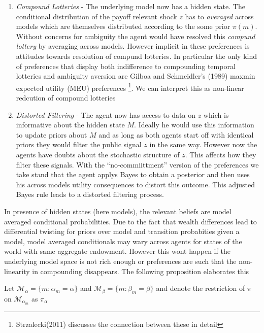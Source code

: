 \documentclass[12pt]{article}
\begin{document}
\begin{enumerate}
\item \emph{Compound Lotteries}  - The underlying model  now has a hidden state. The conditional distribution of the payoff relevant shock $z$  has to \emph{averaged} across models which are themselves distributed according to the some prior $\pi(m)$. Without concerns for ambiguity the agent would have resolved this \emph{compund lottery} by averaging across models. However implicit in these preferences is attitudes towards resolution of compund lotteries.  In particular the only kind of preferences that display both indifference to compounding temporal lotteries and ambiguity aversion are Gilboa and Schmeidler's (1989) maxmin expected utility (MEU) preferences \footnote{Strzalecki(2011) discusses the connection between these in detail}. We can interpret this as non-linear redcution of compound lotteries

\item \emph{Distorted Filtering } - The agent now has access to data on $z$ which is informative about the hidden state $M$. Ideally he would use this information to update priors about $M$ and as long as both agents start off with identical priors they would filter the public signal $z$ in the same way. However now the agents have doubts about the stochastic structure of $z$. This affects how they filter these signals. With the ``no-commiittment'' version of the preferences we take stand that the agent applys Bayes to obtain a posterior and then uses his across models utility consequences to distort this outcome. This adjusted Bayes rule leads to a distorted filtering process. 
\end{enumerate}

\noindent In presence of hidden states (here models), the relevant beliefs are model averaged conditional probabilities. Due to the fact that wealth differences lead to differential twisting for priors over model and transition probabities given a  model, model averaged conditionals may wary across agents for states of the world with same aggregate endowment. However this wont happen if the underlying model space is not rich enough or preferences are such that the non-linearity in compounding disappears. The following proposition elaborates this


\noindent Let $\mathcal{M}_{\alpha} = \{m : \alpha_m=\alpha\}$ and  $\mathcal{M}_{\beta} = \{m : \beta_m=\beta\}$ and denote the restriction of $\pi$ on  $\mathcal{M}_{\alpha_m}$ as $\pi_{\alpha}$
\end{document}
